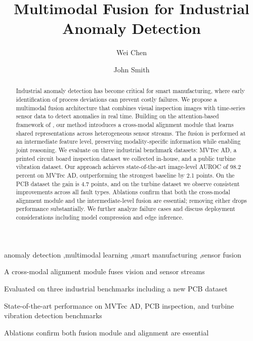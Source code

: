 \documentclass[a4paper,fleqn]{cas-dc}
\begin{document}
\title[mode=title]{Multimodal Fusion for Industrial Anomaly Detection}

\author[1]{Wei Chen}
\cormark[1]

\author[2]{John Smith}




\begin{abstract}
Industrial anomaly detection has become critical for smart manufacturing,
where early identification of process deviations can prevent costly failures.
We propose a multimodal fusion architecture that combines visual inspection
images with time-series sensor data to detect anomalies in real time.
Building on the attention-based framework of \citep{smith2020}, our method
introduces a cross-modal alignment module that learns shared representations
across heterogeneous sensor streams. The fusion is performed at an intermediate
feature level, preserving modality-specific information while enabling joint
reasoning. We evaluate on three industrial benchmark datasets: MVTec AD,
a printed circuit board inspection dataset we collected in-house, and
a public turbine vibration dataset. Our approach achieves state-of-the-art
image-level AUROC of 98.2 percent on MVTec AD, outperforming the strongest
baseline by 2.1 points. On the PCB dataset the gain is 4.7 points, and on
the turbine dataset we observe consistent improvements across all fault
types. Ablations confirm that both the cross-modal alignment module and
the intermediate-level fusion are essential; removing either drops
performance substantially. We further analyze failure cases and discuss
deployment considerations including model compression and edge inference.
\end{abstract}

\begin{keywords}
anomaly detection \sep multimodal learning \sep smart manufacturing \sep sensor fusion
\end{keywords}

\begin{highlights}
\item A cross-modal alignment module fuses vision and sensor streams
\item Evaluated on three industrial benchmarks including a new PCB dataset
\item State-of-the-art performance on MVTec AD, PCB inspection, and turbine vibration detection benchmarks
\item Ablations confirm both fusion module and alignment are essential
\end{highlights}
\end{document}
